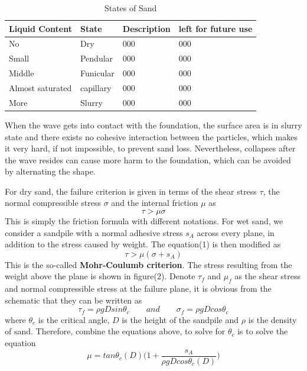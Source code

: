 \documentclass[12pt]{article}
\begin{document}
\begin{table}[H]
    \caption{States of Sand}
    \vspace{10pt}
    \centering
    \begin{tabular}{p{4cm}p{2cm}p{4cm}p{4cm}}
        \hline
        Liquid Content   & State     & Description & left for future use \\
        \hline
        No               & Dry       & 000         & 000                 \\
        Small            & Pendular  & 000         & 000                 \\
        Middle           & Funicular & 000         & 000                 \\
        Almost saturated & capillary & 000         & 000                 \\
        More             & Slurry    & 000         & 000                 \\
        \hline
    \end{tabular}
    \label{bs2}
\end{table}
\par
When the wave gets into contact with the foundation, the surface area is in slurry state and there exists no cohesive interaction between the particles, which makes it very hard, if not impossible, to prevent sand loss. Nevertheless, collapses after the wave resides can cause more harm to the foundation, which can be avoided by alternating the shape.
\par
For dry sand, the failure criterion is given in terms of the shear stress $\tau$, the normal compressible stress $\sigma$ and the internal friction $\mu$ as
$$\tau > \mu\sigma$$
This is simply the friction formula with different notations. For wet sand, we consider a sandpile with a normal adhesive stress $s_A$ across every plane, in addition to the stress caused by weight. The equation(1) is then modified as
$$\tau > \mu(\sigma + s_A)$$
This is the so-called \textbf{Mohr-Coulumb criterion}. The stress resulting from the weight above the plane is shown in figure(2). Denote $\tau_f$ and $\mu_f$ as the shear stress and normal compressible stress at the failure plane, it is obvious from the schematic that they can be written as
$$\tau_f = \rho gDsin\theta_c \qquad and \qquad \sigma_f = \rho gDcos\theta_c$$
where $\theta_c$ is the critical angle, $D$ is the height of the sandpile and $\rho$ is the density of sand. Therefore, combine the equations above, to solve for $\theta_c$ is to solve the equation
$$\mu = tan\theta_c(D)\bigg(1 + \frac{s_A}{\rho gDcos\theta_c(D)}\bigg)$$
\end{document}
